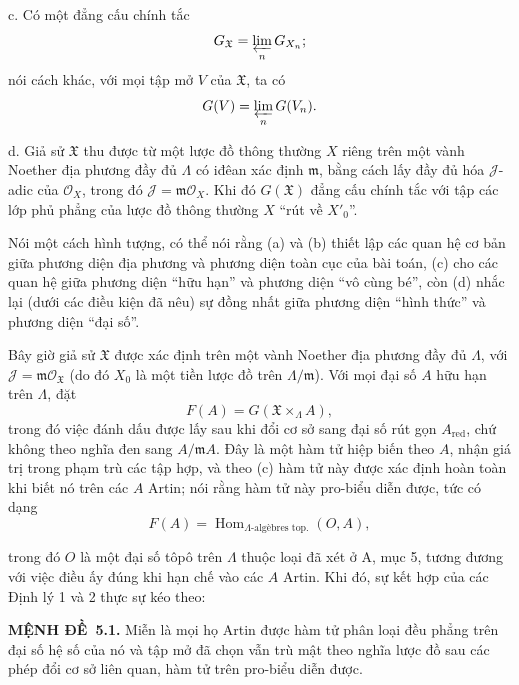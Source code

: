 \documentclass[11pt,twoside,openany]{book}
\numberwithin{equation}{section}
\newcommand{\src}[1]{%
  \phantomsection\hypertarget{src:\fgasourceid:#1}{}%
  \marginpar{\raggedleft\footnotesize\sffamily #1}%
}
\newcommand{\fgasourceid}{unset}
\newcommand{\result}[2]{\par\medskip\noindent\textbf{#1\if\relax\detokenize{#2}\relax\else\ #2\fi.}\quad}
\begin{document}
\noindent c. Có một đẳng cấu chính tắc
\[
  G_{\mathfrak X}=\varprojlim_nG_{X_n} ;
\]
nói cách khác, với mọi tập mở $V$ của $\mathfrak X$, ta có
\[
  G(V)=\varprojlim_nG(V_n).
\]

\noindent d. Giả sử $\mathfrak X$ thu được từ một lược đồ thông thường $X$
riêng trên một vành Noether địa phương đầy đủ $\Lambda$ có iđêan xác định
$\mathfrak m$, bằng cách lấy đầy đủ hóa $\mathcal J$-adic của $\mathcal O_X$,
trong đó $\mathcal J=\mathfrak m\mathcal O_X$. Khi đó $G(\mathfrak X)$ đẳng
cấu chính tắc với tập các lớp phủ phẳng của lược đồ thông thường $X$ ``rút về
$X'_0$''.

Nói một cách hình tượng, có thể nói rằng (a) và (b) thiết lập các quan hệ cơ
bản giữa phương diện địa phương và phương diện toàn cục của bài toán, (c) cho
các quan hệ giữa phương diện ``hữu hạn'' và phương diện ``vô cùng bé'', còn
(d) nhắc lại (dưới các điều kiện đã nêu) sự đồng nhất giữa phương diện ``hình
thức'' và phương diện ``đại số''.

Bây giờ giả sử $\mathfrak X$ được xác định trên một vành Noether địa phương
đầy đủ $\Lambda$, với $\mathcal J=\mathfrak m\mathcal O_{\mathfrak X}$ (do đó
$X_0$ là một tiền lược đồ trên $\Lambda/\mathfrak m$). Với mọi đại số $A$ hữu
hạn trên $\Lambda$, đặt
\[
  F(A)=G(\mathfrak X\times_\Lambda A),
\]
trong đó việc đánh dấu được lấy sau khi đổi cơ sở sang đại số rút gọn
$A_{\mathrm{red}}$, chứ không theo nghĩa đen sang $A/\mathfrak mA$. Đây là một
hàm tử hiệp biến theo $A$, nhận giá trị trong phạm trù các tập hợp, và theo (c)
hàm tử này được xác định hoàn toàn khi biết nó trên các $A$ Artin; nói rằng
hàm tử này pro-biểu diễn được, tức có dạng
\[
  F(A)=\operatorname{Hom}_{\Lambda\text{-algèbres top.}}(O,A),
\]

\src{389}
trong đó $O$ là một đại số tôpô trên $\Lambda$ thuộc loại đã xét ở A, mục 5,
tương đương với việc điều ấy đúng khi hạn chế vào các $A$ Artin. Khi đó, sự kết
hợp của các Định lý 1 và 2 thực sự kéo theo:

\result{MỆNH ĐỀ}{5.1} Miễn là mọi họ Artin được hàm tử phân loại đều phẳng trên
đại số hệ số của nó và tập mở đã chọn vẫn trù mật theo nghĩa lược đồ sau các
phép đổi cơ sở liên quan, hàm tử trên pro-biểu diễn được.
\end{document}
